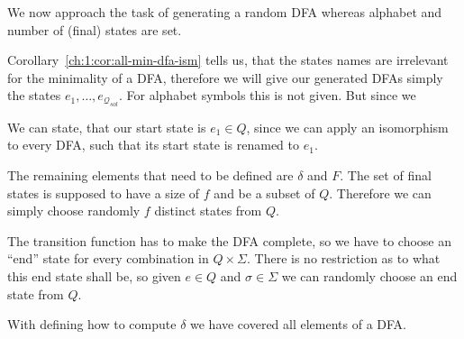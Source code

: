 We now approach the task of generating a random DFA whereas alphabet and number of (final) states are set.

Corollary~\ref{ch:1:cor:all-min-dfa-ism} tells us, that the states names are irrelevant for the minimality of a DFA, therefore we will give our generated DFAs simply the states $e_1, \ldots, e_{\mathcal{Q}_{sol}}$. For alphabet symbols this is not given. But since we 

We can state, that our start state is $e_1 \in Q$, since we can apply an isomorphism to every DFA, such that its start state is renamed to $e_1$.

The remaining elements that need to be defined are $\delta$ and $F$. The set of final states is supposed to have a size of $f$ and be a subset of $Q$. Therefore we can simply choose randomly $f$ distinct states from $Q$.

The transition function has to make the DFA complete, so we have to choose an ``end'' state for every combination in $Q \times \Sigma$. There is no restriction as to what this end state shall be, so given $e \in Q$ and $\sigma \in \Sigma$ we can randomly choose an end state from $Q$.

With defining how to compute $\delta$ we have covered all elements of a DFA.

